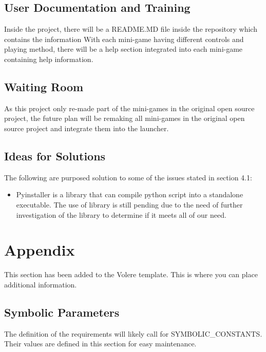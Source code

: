 \documentclass[12pt, titlepage]{article}
\begin{document}
\subsection{User Documentation and Training}

Inside the project, there will be a README.MD file inside the repository which contains the information
With each mini-game having different controls and playing method, there will be a help section integrated into each mini-game containing help information.

\subsection{Waiting Room}

As this project only re-made part of the mini-games in the original open source project, the future plan will be remaking all mini-games in the original open source project and integrate them into the launcher.

\subsection{Ideas for Solutions}

The following are purposed solution to some of the issues stated in section 4.1:
\begin{itemize}
    \item Pyinstaller is a library that can compile python script into a standalone executable. The use of library is still pending due to the need of further investigation of the library to determine if it meets all of our need.
\end{itemize}





\newpage

\section{Appendix}

This section has been added to the Volere template.  This is where you can place
additional information.

\subsection{Symbolic Parameters}

The definition of the requirements will likely call for SYMBOLIC\_CONSTANTS.
Their values are defined in this section for easy maintenance.
\end{document}
